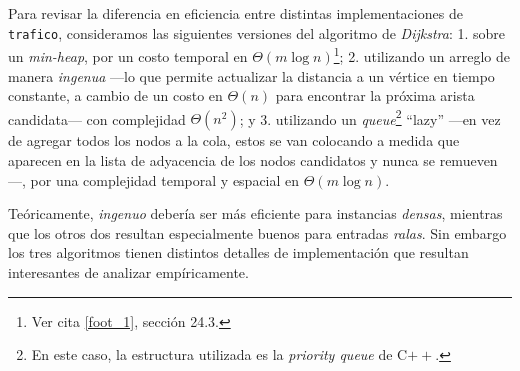 Para revisar la diferencia en eficiencia entre distintas implementaciones de \texttt{trafico}, consideramos las siguientes versiones del algoritmo de \textit{Dijkstra}: 1. sobre un \textit{min-heap}, por un costo temporal en $\Theta(m\log n)$\footnote{Ver cita \ref{foot_1}, sección 24.3.}; 2. utilizando un arreglo de manera \textit{ingenua} ---lo que permite actualizar la distancia a un vértice en tiempo constante, a cambio de un costo en $\Theta(n)$ para encontrar la próxima arista candidata--- con complejidad $\Theta(n^2)$; y 3. utilizando un \textit{queue}\footnote{En este caso, la estructura utilizada es la \textit{priority queue} de C$++$.} ``lazy'' ---en vez de agregar todos los nodos a la cola, estos se van colocando a medida que aparecen en la lista de adyacencia de los nodos candidatos y nunca se remueven---, por una complejidad temporal y espacial en $\Theta(m\log n)$.

Teóricamente, \textit{ingenuo} debería ser más eficiente para instancias \textit{densas}, mientras que los otros dos resultan especialmente buenos para entradas \textit{ralas}. Sin embargo los tres algoritmos tienen distintos detalles de implementación que resultan interesantes de analizar empíricamente.%

